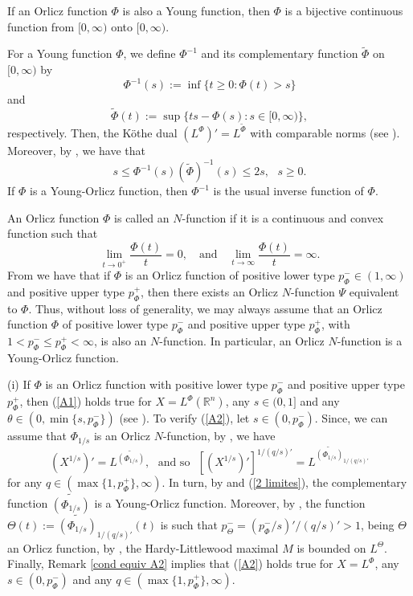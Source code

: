 \documentclass[oneside,10pt]{article}
\begin{document}
If an Orlicz function $\Phi$ is also a Young function, then $\Phi$ is a bijective continuous function from $[0, \infty)$ onto $[0, \infty)$.

For a Young function $\Phi$, we define $\Phi^{-1}$ and its complementary function $\widetilde{\Phi}$ on $[0, \infty)$ by
\[
\Phi^{-1}(s):= \inf\{ t \geq 0 : \Phi(t) > s \}
\]
and
\[
\widetilde{\Phi}(t) := \sup\{ ts - \Phi(s) : s \in [0, \infty) \},
\]
respectively. Then, the K\"othe dual $(L^{\Phi})' = L^{\widetilde{\Phi}}$ with comparable norms 
(see \cite[Lemma 2.4.2 and Theorem 3.4.6]{Hasto}). Moreover, by \cite[Property 1.6]{ONeil}, we have that
\begin{equation} \label{prop 1.6}
s \leq \Phi^{-1}(s) (\widetilde{\Phi})^{-1}(s) \leq 2s, \,\,\,\, s \geq 0.
\end{equation}
If $\Phi$ is a Young-Orlicz function, then $\Phi^{-1}$ is the usual inverse function of $\Phi$.

An Orlicz function $\Phi$ is called an $N$-function if it is a continuous and convex function such that
\begin{equation} \label{2 limites}
\lim_{t \to 0^{+}} \frac{\Phi(t)}{t} = 0, \,\,\,\,\,\, \text{and} \,\,\,\,\,\,  \lim_{t \to \infty} \frac{\Phi(t)}{t} = \infty.
\end{equation}
From \cite[Lemma 2.16]{Zhang2019} we have that if $\Phi$ is an Orlicz function of positive lower type $p_{\Phi}^{-} \in (1, \infty)$ and positive upper type $p_{\Phi}^{+}$, then there exists an Orlicz 
$N$-function $\Psi$ equivalent to $\Phi$. Thus, without loss of generality, we may always assume that an Orlicz function $\Phi$ of positive lower type $p_{\Phi}^{-}$ and positive upper type $p_{\Phi}^{+}$, with $1 < p_{\Phi}^{-} \leq p_{\Phi}^{+} < \infty$, is also an $N$-function. In particular, an Orlicz $N$-function is a Young-Orlicz function.


(i) If $\Phi$ is an Orlicz function with positive lower type $p_{\Phi}^{-}$ and positive upper type 
$p_{\Phi}^{+}$, then (\ref{A1}) holds true for $X= L^{\Phi}(\mathbb{R}^n)$, any $s \in (0,1]$ and any 
$\theta \in (0, \min\{ s, p_{\Phi}^{-}\})$ (see \cite[Theorem 7.14 (i)]{sawa}). To verify (\ref{A2}), let $s \in (0, p_{\Phi}^{-})$. Since, 
we can assume that $\Phi_{1/s}$ is an Orlicz $N$-function, by \cite[Theorem 3.4.6]{Hasto}, we have 
\[
(X^{1/s})' = L^{\widetilde{(\Phi_{1/s})}}, \,\,\,\, \text{and so} \,\,\,\, [(X^{1/s})']^{1/(q/s)'}= L^{\widetilde{(\Phi_{1/s})}_{1/(q/s)'}}
\]
for any $q \in (\max\{1, p_{\Phi}^{+} \}, \infty)$. In turn, by \cite[Lemma 2.4.2]{Hasto} and (\ref{2 limites}), the complementary function 
$\widetilde{(\Phi_{1/s})}$ is a Young-Orlicz function. Moreover, by \cite[Proposition 7.8]{sawa}, the function
$\Theta(t) := \widetilde{(\Phi_{1/s})}_{1/(q/s)'}(t)$ is such that $p_{\Theta}^{-} = (p_{\Phi}^{-}/s)'/(q/s)' > 1$, being $\Theta$ an Orlicz function, by \cite[Theorem 7.12]{sawa}, the Hardy-Littlewood maximal $M$ is bounded on $L^{\Theta}$. Finally, Remark \ref{cond equiv A2} implies that (\ref{A2}) holds true for $X = L^{\Phi}$, any $s \in (0, p_{\Phi}^{-})$ and any $q \in (\max\{1, p_{\Phi}^{+} \}, \infty)$.
\end{document}
